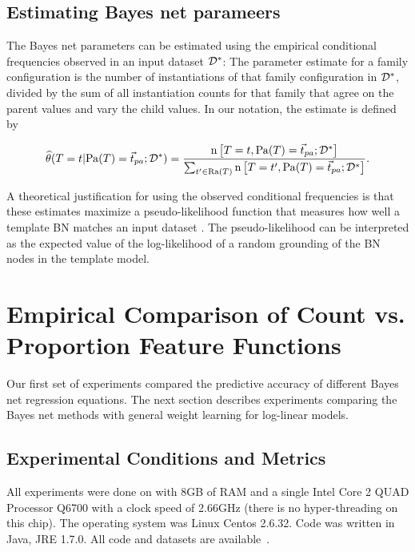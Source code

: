 \documentclass[twoside,11pt]{article}
\begin{document}
\subsection{Estimating Bayes net parameers}

The Bayes net parameters can be estimated using the empirical conditional frequencies observed in an input dataset $\mathcal{D}^{*}\hspace{0.0ex}$: The parameter estimate for a family configuration is the number of instantiations of that family configuration in $\mathcal{D}^{*}\hspace{0.0ex}$, divided by the sum of all instantiation counts for that family that agree on the parent values and vary the child values. In our notation, the estimate is defined by

\newcommand{\CTPa}{\Count{\Appendterm{\TT = \TV} {\Pa{\TT} = \Prange{\TT}}}  {\FG{\D}}}
\newcommand{\CTPb}{\Count{\Appendterm{\TT = \TV'} {\Pa{\TT} = \Prange{\TT}}}  {\FG{\D}}}

\begin{equation} \label{eq:frequencies}
\estcprob{\TT = \TV} {\Pa{\TT} = \Prange{\TT}} {\FG{\D}} = 
    \frac{\CTPa}
           {\sum_{\TV' \in \Range{\TT}}\CTPb}.
\end{equation}

A theoretical justification for using the observed conditional frequencies is that these estimates maximize a pseudo-likelihood function that measures how well a template BN matches an input dataset \cite{Schulte2011,Schulte2013}. The pseudo-likelihood can be interpreted as the expected value of the log-likelihood of a random grounding of the BN nodes in the template model.

\section{Empirical Comparison of Count vs. Proportion Feature Functions}\label{sec:empirical-comparison}

Our first set of experiments compared the predictive accuracy of different Bayes net regression equations. The next section describes experiments comparing the Bayes net methods with general weight learning for log-linear models. 

\subsection{Experimental Conditions and Metrics}\label{sec:conditions}

All experiments were done on with 8GB of RAM and a single Intel Core 2 QUAD Processor Q6700 with a clock speed of 2.66GHz (there is no hyper-threading on this chip). The operating system was Linux Centos 2.6.32. Code was written in Java, JRE 1.7.0. All code and datasets are available~\cite{bib:jbnsite}. 
\end{document}
